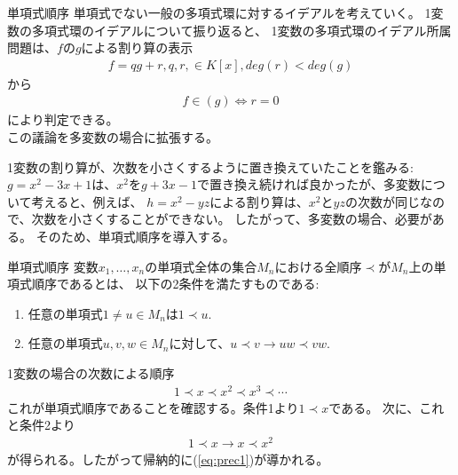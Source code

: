 \begin{frame} {単項式順序}
	単項式でない一般の多項式環に対するイデアルを考えていく。
	1変数の多項式環のイデアルについて振り返ると、
	1変数の多項式環のイデアル所属問題は、$f$の$g$による割り算の表示
	\begin{align*}
		f = qg + r, q, r, \in K[x], deg(r) < deg(g)
	\end{align*}
	から
	\begin{align*}
		f \in (g) \Leftrightarrow r = 0
	\end{align*}
	により判定できる。\\
	この議論を多変数の場合に拡張する。
\end{frame}

\begin{frame}
	1変数の割り算が、次数を小さくするように置き換えていたことを鑑みる:
	$g = x^2-3x+1$は、$x^2$を$g+3x-1$で置き換え続ければ良かったが、多変数について考えると、例えば、
	$h=x^2 - yz$による割り算は、$x^2$と$yz$の次数が同じなので、次数を小さくすることができない。
	したがって、多変数の場合、必要がある。
	そのため、単項式順序を導入する。
	\begin{definition} {単項式順序}
		変数$x_1, \ldots, x_n$の単項式全体の集合$M_n$における全順序$\prec$が$M_n$上の単項式順序であるとは、
		以下の2条件を満たすものである:
		\begin{enumerate}
			\item 任意の単項式$1 \neq u \in M_n$は$1 \prec u$.
			\item 任意の単項式$u, v, w \in M_n$に対して、$u \prec v \rightarrow uw \prec vw$.
		\end{enumerate}
	\end{definition}
\end{frame}

\begin{frame}
	\begin{exampleblock} [1変数の例]
		1変数の場合の次数による順序
		\begin{align}
			1 \prec x \prec x^2 \prec x^3 \prec \cdots \label{eq:prec1}
		\end{align}
		これが単項式順序であることを確認する。条件1より$1 \prec x$である。
		次に、これと条件2より
		\begin{align*}
			1 \prec x \rightarrow x \prec x^2
		\end{align*}
		が得られる。したがって帰納的に(\ref{eq:prec1})が導かれる。
	\end{exampleblock}
\end{frame}

